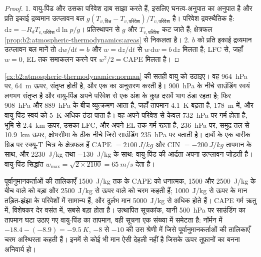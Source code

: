 \begin{proof}
1. वायु-पिंड और उसका परिवेश दाब साझा करते हैं, इसलिए घनत्व-अनुपात
 का अनुपात है और प्रति इकाई द्रव्यमान उत्प्लावन बल
$g(T_{v,\text{पिंड}} - T_{v,\text{परिवेश}})/T_{v,\text{परिवेश}}$ है। परिवेश द्रवस्थैतिक है:
$\mathrm{d}z = -R_dT_{v,\text{परिवेश}}\,\mathrm{d}\ln p/g$। प्रतिस्थापन से $g$ और
$T_{v,\text{परिवेश}}$ कट जाते हैं; क्षेत्रफल \cref{prop:b2:atmospheric-thermodynamics:areas} से निकलता है।
2. $b$ को प्रति इकाई द्रव्यमान उत्प्लावन बल मानें तो $\mathrm{d}w/\mathrm{d}t = b$ और $w = \mathrm{d}z/
\mathrm{d}t$ से $w\,\mathrm{d}w = b\,\mathrm{d}z$ मिलता है; LFC से, जहाँ $w = 0$,
EL तक समाकलन करने पर $w^2/2 = \text{CAPE}$ मिलता है।
\end{proof}

\begin{example}[नॉर्मन साउंडिंग में ऊर्जा]\label{ex:b2:atmospheric-thermodynamics:cape}
\cref{ex:b2:atmospheric-thermodynamics:norman} की सतही वायु को उठाइए। वह
\qty{964}{hPa} पर, \qty{64}{m} ऊपर, संतृप्त होती है, और एक  का अनुसरण करती है। \qty{900}{hPa} के नीचे साउंडिंग
स्वयं लगभग संतृप्त है और वायु-पिंड अपने परिवेश से एक अंश के कुछ दसवें भाग ठंडा
रहता है; फिर \qty{908}{hPa} और \qty{889}{hPa} के बीच व्युत्क्रमण आता है, जहाँ
तापमान \qty{4.1}{K} बढ़ता है, \qty{178}{m} में, और वायु-पिंड स्वयं को \qty{5}{K} अधिक
ठंडा पाता है। वह अपने परिवेश से केवल \qty{732}{hPa} पर गर्म होता है, भूमि से \qty{2.4}{km} ऊपर,
उसका LFC, और अपने EL तक गर्म रहता है, \qty{236}{hPa} पर, समुद्र-तल से \qty{10.9}{km} ऊपर,
क्षोभसीमा के ठीक नीचे जिसे साउंडिंग \qty{235}{hPa} पर बताती है। दाबों के एक बारीक ग्रिड पर
स्क्यू-T चित्र के क्षेत्रफल हैं CAPE $= \qty{2100}{J/kg}$ और CIN $= \qty{-200}{J/kg}$
तापमान के साथ, और \qty{2230}{J/kg} तथा \qty{-130}{J/kg}  के साथ: वायु-पिंड की आर्द्रता
अपना उत्प्लावन जोड़ती है। वायु-पिंड सिद्धांत $w_{\max} = \sqrt{2 \times 2100} =
\qty{65}{m/s}$ देता है।
\end{example}

पूर्वानुमानकर्ताओं की तालिकाएँ \qty{1500}{J/kg} तक के CAPE को धनात्मक, 1500 और
\qty{2500}{J/kg} के बीच वाले को बड़ा और \qty{2500}{J/kg} से ऊपर वाले को चरम कहती हैं; \qty{1000}{J/kg} से ऊपर के मान तड़ित-झंझा के परिवेशों में सामान्य हैं,
और दुर्लभ मान \qty{5000}{J/kg} से अधिक होते हैं। CAPE गर्म ऋतु में, विशेषकर देर
वसंत में, सबसे बड़ा होता है। उत्थापित सूचकांक, यानी \qty{500}{hPa} पर साउंडिंग का तापमान घटा उठाए गए
वायु-पिंड का तापमान, वही सूचना एक संख्या में समेटता है: नॉर्मन में $-18.4 - (-8.9) = \qty{-9.5}{K}$,
$-8$ से $-10$ की उस श्रेणी में जिसे पूर्वानुमानकर्ताओं की तालिकाएँ चरम अस्थिरता कहती हैं। इनमें से कोई भी
मान ऐसी देहली नहीं है जिसके ऊपर तूफ़ानों का बनना अनिवार्य हो।

